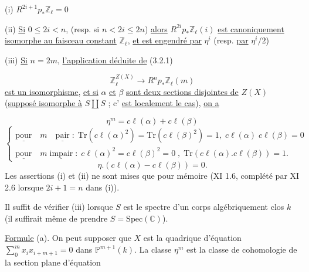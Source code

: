 (i) \quad $R^{2i+1} p_* \mathbb{Z}_\ell = 0$ 



(ii) \underline{Si} $0 \leqslant 2i < n$, (resp. si $n< 2i \leqslant 2n$) \underline{alors} $R^{2i}p_{*} \mathbb{Z}_{\ell}(i)$ \underline{est canoniquement isomorphe au faisceau constant} $\mathbb{Z}_{\ell}$, \underline{et est engendré par} $\eta^{i}$ (resp. \underline{par} $\eta^{i}/2$)

(iii) \underline{Si} $n = 2m$, \underline{l'application déduite de} (3.2.1)

\begin{equation}\tag{3.2.1}
\mathbb{Z}_{\ell}^{Z(X)} \longrightarrow R^{n}p_{*} \mathbb{Z}_{\ell}(m)
\end{equation}
\underline{est un isomorphisme}, \underline{et si} $\alpha$ \underline{et} $\beta$ \underline{sont deux sections disjointes de} $Z(X)$ (\underline{supposé isomorphe à} $S \amalg S$ ; c' \underline{est localement le cas}), \underline{on a}

\begin{equation*}
\eta^{m} = c\ell(\alpha) + c\ell(\beta)
\end{equation*}
\begin{equation*}
\left\{ \begin{array}{l} \underline{\mathrm{pour}} \quad m \quad \underline{\mathrm{pair}} \; : \; \mathrm{Tr}(c\ell(\alpha)^{2}) = \mathrm{Tr}(c\ell(\beta)^{2}) = 1, \; c\ell(\alpha) \; c\ell(\beta) = 0 \\[2ex] \underline{\mathrm{pour}} \quad m \; \underline{\mathrm{impair}} \; : \; c\ell(\alpha)^{2} = c\ell(\beta)^{2} = 0 \; , \; \mathrm{Tr}(c\ell(\alpha).c\ell(\beta)) = 1. \end{array} \right.
\end{equation*}
\begin{equation*}
\eta.(c\ell(\alpha) - c\ell(\beta)) = 0.
\end{equation*}
Les assertions (i) et (ii) ne sont mises que pour mémoire (XI 1.6, complété par XI 2.6 lorsque $2i + 1 = n$ dans (i)).

Il suffit de vérifier (iii) lorsque $S$ est le spectre d'un corps algébriquement clos $k$ (il suffirait même de prendre $S = \mathrm{Spec}(\mathbb{C})$).

\underline{Formule} (a). On peut supposer que $X$ est la quadrique d'équation $\sum\limits_{0}^{m} x_{i}x_{i+m+1} = 0$ dans $\mathbb{P}^{m+1}(k)$. La classe $\eta^{m}$ est la classe de cohomologie de la section plane d'équation

